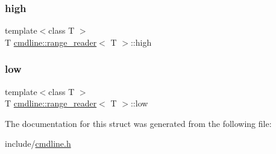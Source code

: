 \subsubsection{\texorpdfstring{high}{high}}
{\footnotesize\ttfamily template$<$class T $>$ \\
T \mbox{\hyperlink{structcmdline_1_1range__reader}{cmdline\+::range\+\_\+reader}}$<$ T $>$\+::high\hspace{0.3cm}{\ttfamily [private]}}

\mbox{\label{structcmdline_1_1range__reader_a60c345e84d2a96dcd2de47a66eca8104}} 
\subsubsection{\texorpdfstring{low}{low}}
{\footnotesize\ttfamily template$<$class T $>$ \\
T \mbox{\hyperlink{structcmdline_1_1range__reader}{cmdline\+::range\+\_\+reader}}$<$ T $>$\+::low\hspace{0.3cm}{\ttfamily [private]}}



The documentation for this struct was generated from the following file\+:\begin{DoxyCompactItemize}
\item 
include/\mbox{\hyperlink{cmdline_8h}{cmdline.\+h}}\end{DoxyCompactItemize}
